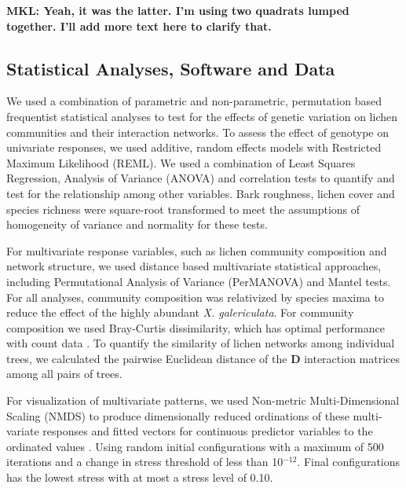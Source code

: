 \documentclass[9pt,twocolumn,twoside,lineno]{pnas-new}
\begin{document}
{\textbf{MKL: Yeah, it was the latter. I'm using two quadrats lumped
  together. I'll add more text here to clarify that.}


\subsection*{Statistical Analyses, Software and Data}

We used a combination of parametric and non-parametric, permutation
based frequentist statistical analyses to test for the effects of
genetic variation on lichen communities and their interaction
networks. To assess the effect of genotype on univariate responses, we
used additive, random effects models with Restricted Maximum
Likelihood (REML). We used a combination of Least Squares Regression,
Analysis of Variance (ANOVA) and correlation tests to quantify and
test for the relationship among other variables. Bark roughness,
lichen cover and species richness were square-root transformed to meet
the assumptions of homogeneity of variance and normality for these
tests.



For multivariate response variables, such as lichen community
composition and network structure, we used distance based multivariate
statistical approaches, including Permutational Analysis of Variance
(PerMANOVA) and Mantel tests. For all analyses, community composition
was relativized by species maxima to reduce the effect of the highly
abundant \textit{X. galericulata}. For community composition we used
Bray-Curtis dissimilarity, which has optimal performance with count
data \citep{Minchen1998}. To quantify the similarity of lichen
networks among individual trees, we calculated the pairwise Euclidean
distance of the $\mathbf{D}$ interaction matrices among all pairs of
trees.

For visualization of multivariate patterns, we used Non-metric
Multi-Dimensional Scaling (NMDS) \cite{ecodist} to produce
dimensionally reduced ordinations of these multi-variate responses and
fitted vectors for continuous predictor variables to the ordinated
values \cite{vegan}. Using random initial configurations with a
maximum of 500 iterations and a change in stress threshold of less
than 10$^{-12}$. Final configurations has the lowest stress with at
most a stress level of 0.10.


}
\end{document}

